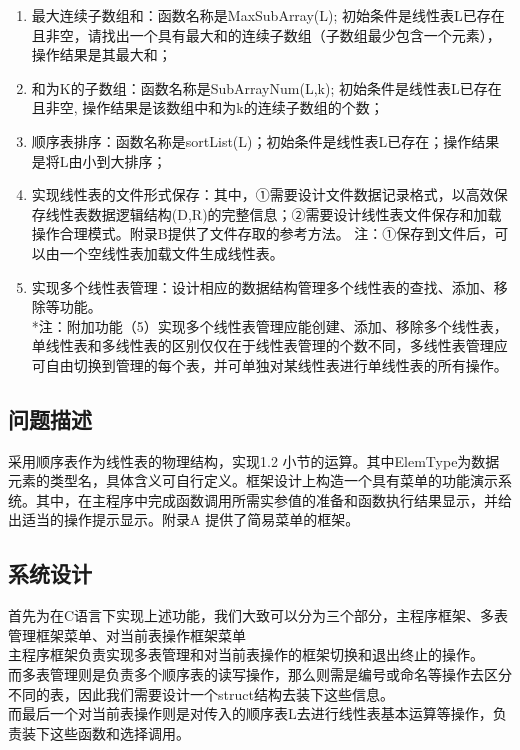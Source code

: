 \documentclass[supercite]{Experimental_Report}
\theoremstyle{definition}
\begin{document}
	\begin{enumerate}
		
		\item	最大连续子数组和：函数名称是MaxSubArray(L); 初始条件是线性表L已存在且非空，请找出一个具有最大和的连续子数组（子数组最少包含一个元素），操作结果是其最大和；
		\item	和为K的子数组：函数名称是SubArrayNum(L,k); 初始条件是线性表L已存在且非空, 操作结果是该数组中和为k的连续子数组的个数；
		\item	顺序表排序：函数名称是sortList(L)；初始条件是线性表L已存在；操作结果是将L由小到大排序；
		\item	实现线性表的文件形式保存：其中，①需要设计文件数据记录格式，以高效保存线性表数据逻辑结构(D,{R})的完整信息；②需要设计线性表文件保存和加载操作合理模式。附录B提供了文件存取的参考方法。
		注：①保存到文件后，可以由一个空线性表加载文件生成线性表。
		\item	实现多个线性表管理：设计相应的数据结构管理多个线性表的查找、添加、移除等功能。\\
		*注：附加功能（5）实现多个线性表管理应能创建、添加、移除多个线性表，单线性表和多线性表的区别仅仅在于线性表管理的个数不同，多线性表管理应可自由切换到管理的每个表，并可单独对某线性表进行单线性表的所有操作。
	\end{enumerate}
	
	
	\subsection{问题描述}
	
	采用顺序表作为线性表的物理结构，实现1.2 小节的运算。其中ElemType为数据元素的类型名，具体含义可自行定义。框架设计上构造一个具有菜单的功能演示系统。其中，在主程序中完成函数调用所需实参值的准备和函数执行结果显示，并给出适当的操作提示显示。附录A 提供了简易菜单的框架。
	
	\subsection{系统设计}
	首先为在C语言下实现上述功能，我们大致可以分为三个部分，主程序框架、多表管理框架菜单、对当前表操作框架菜单\\主程序框架负责实现多表管理和对当前表操作的框架切换和退出终止的操作。\\
	而多表管理则是负责多个顺序表的读写操作，那么则需是编号或命名等操作去区分不同的表，因此我们需要设计一个struct结构去装下这些信息。\\
	而最后一个对当前表操作则是对传入的顺序表L去进行线性表基本运算等操作，负责装下这些函数和选择调用。
	
\end{document}
